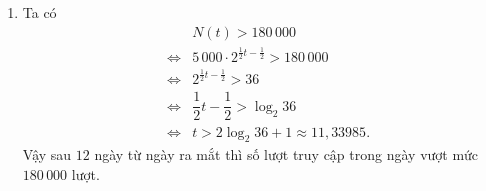 \begin{bt}
{\begin{enumerate}
			Vậy $N(t) = 5\,000\cdot 2^{\tfrac{1}{2}t-\tfrac{1}{2}}$.
			\item Ta có 
			\allowdisplaybreaks
			\begin{eqnarray*}
				&& N(t) > 180\,000 \\
				&\Leftrightarrow& 5\,000\cdot 2^{\tfrac{1}{2}t-\tfrac{1}{2}} > 180\, 000 \\
				&\Leftrightarrow& 2^{\tfrac{1}{2}t-\tfrac{1}{2}} > 36 \\
				&\Leftrightarrow& \dfrac{1}{2}t - \dfrac{1}{2} > \log_2 36 \\
				&\Leftrightarrow& t > 2\log_2 36 + 1\approx 11{,}33985.
			\end{eqnarray*}
			Vậy sau $12$ ngày từ ngày ra mắt thì số lượt truy cập trong ngày vượt mức $180\,000$ lượt.
		\end{enumerate}
	}
\end{bt}


